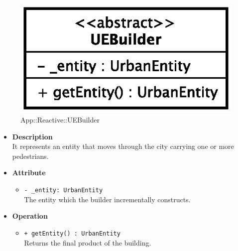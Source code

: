 \begin{figure}[h]
\centering
\includegraphics[scale=0.6,keepaspectratio]{images/solution/uebuilder.eps}
\caption{App::Reactive::UEBuilder}
\label{fig:sd-app-uebuilder}
\end{figure}
\FloatBarrier
\begin{itemize}
  \item \textbf{Description} \\
    It represents an entity that moves through the city carrying one or more
pedestrians.
  \item \textbf{Attribute}
  \begin{itemize}
    \item \texttt{- \_entity: UrbanEntity} \\
The entity which the builder incrementally constructs.
  \end{itemize}
  \item \textbf{Operation}
  \begin{itemize} 
    \item \texttt{+ getEntity() : UrbanEntity} \\
Returns the final product of the building.
  \end{itemize}
\end{itemize}
